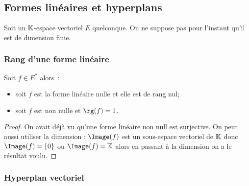 \subsection{Formes linéaires et hyperplans}

Soit un $\mathbb{K}$-espace vectoriel $E$ quelconque. On ne suppose pas pour l'instant qu'il est de dimension finie.

\subsubsection{Rang d'une forme linéaire}

\begin{prop}
  Soit $f \in E^*$ alors~:
  \begin{itemize}
  \item soit $f$ est la forme linéaire nulle et elle est de rang nul;
  \item soit $f$ est non nulle et $\rg(f)=1$.
  \end{itemize}
\end{prop}
\begin{proof}
  On avait déjà vu qu'une forme linéaire non null est surjective. On peut aussi utiliser la dimension : $\Image(f)$ est un sous-espace vectoriel de $\mathbb{K}$ donc $\Image(f) = \{0\}$ ou $\Image(f) = \K$ alors en passant à la dimension on a le résultat voulu.
\end{proof}

\subsubsection{Hyperplan vectoriel}

